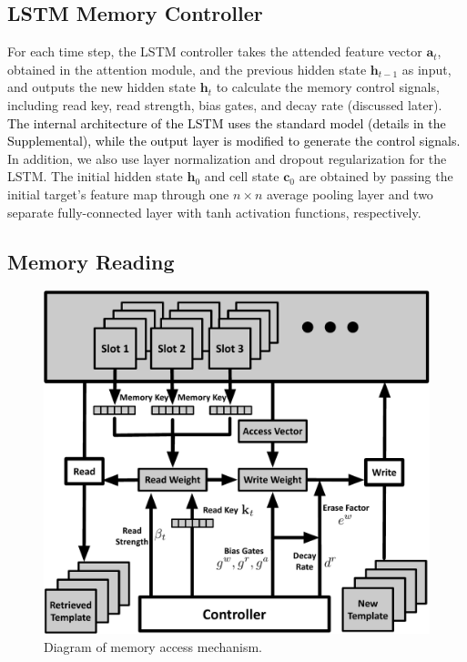 \documentclass[runningheads]{llncs}
\newcommand{\abcn}[1]{\textcolor{black}{#1}}
\begin{document}
\subsection{LSTM Memory Controller}

For each time step, the LSTM controller takes the attended feature vector $\mathbf{a}_t$, obtained in the attention module, and the previous hidden state $\mathbf{h}_{t-1}$ as input, and outputs the new hidden state $\mathbf{h}_t$ to calculate the memory control signals, including read key, read strength, bias gates, and decay rate (discussed later).
\abcn{The internal architecture of the LSTM uses the standard model (details in the Supplemental), while the output layer is modified to generate the control signals.}
In addition, we also use layer normalization \cite{Ba2016} and dropout regularization \cite{Srivastava2014} for the LSTM. The initial hidden state $\mathbf{h}_0$ and cell state $\mathbf{c}_0$  %
are  
obtained by passing the initial target's feature map through one $n\times n$ average pooling layer and two separate fully-connected layer with tanh activation functions, respectively.


\subsection{Memory Reading}
\begin{figure}[t]
	\begin{center}
		\includegraphics[width=0.61\linewidth]{figs/mem_access.pdf}
	\end{center}
	\caption{Diagram of memory access mechanism.}
	\label{fig:4}
\end{figure}
\end{document}
